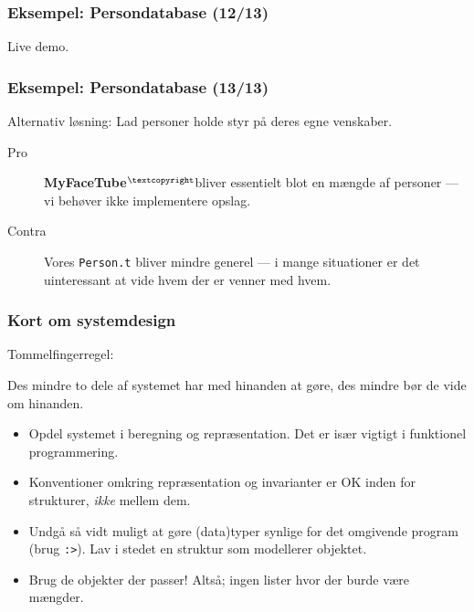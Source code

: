 \documentclass[slidestop,compress,mathserif, xcolor=table]{beamer}
\newcommand{\mft}{\textbf{MyFaceTube$^{\scriptsize{\textcopyright}}$}}
\begin{document}
\begin{frame}[c]
  \frametitle{Eksempel: Persondatabase \quad (12/13)}
  \begin{center}
    \Huge{Live demo.}
  \end{center}
\end{frame}

\begin{frame}
  \frametitle{Eksempel: Persondatabase \quad (13/13)}

  Alternativ løsning: Lad personer holde styr på deres egne venskaber.

  \begin{description}
  \item[Pro] \mft bliver essentielt blot en mængde af personer --- vi behøver
    ikke implementere opslag.
  \item[Contra] Vores \texttt{Person.t} bliver mindre generel --- i mange
    situationer er det uinteressant at vide hvem der er venner med hvem.
  \end{description}

\end{frame}

\begin{frame}
  \frametitle{Kort om systemdesign}
  Tommelfingerregel:
  \begin{block}{}
    Des mindre to dele af systemet har med hinanden at gøre, des mindre bør de
    vide om hinanden.
  \end{block}
  \begin{itemize}
  \item Opdel systemet i beregning og repræsentation. Det er især vigtigt i
    funktionel programmering.
  \item Konventioner omkring repræsentation og invarianter er OK inden for
    strukturer, \textit{ikke} mellem dem.
  \item Undgå så vidt muligt at gøre (data)typer synlige for det omgivende
    program (brug \texttt{:>}). Lav i stedet en struktur som modellerer
    objektet.
  \item Brug de objekter der passer! Altså; ingen lister hvor der burde være
    mængder.
  \end{itemize}
\end{frame}
\end{document}
